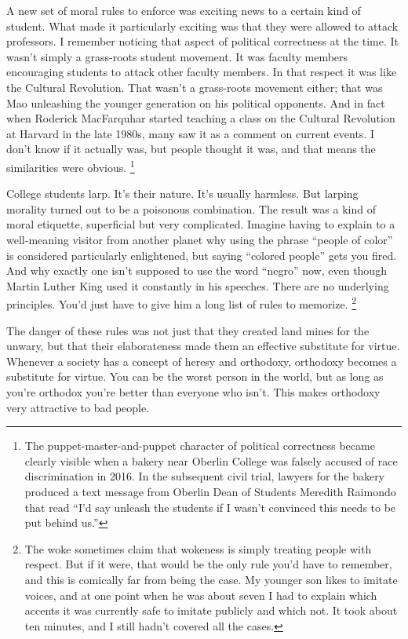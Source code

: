 A new set of moral rules to enforce was exciting news to a certain kind
of student. What made it particularly exciting was that they were
allowed to attack professors. I remember noticing that aspect of
political correctness at the time. It wasn't simply a grass-roots
student movement. It was faculty members encouraging students to attack
other faculty members. In that respect it was like the Cultural
Revolution. That wasn't a grass-roots movement either; that was Mao
unleashing the younger generation on his political opponents. And in
fact when Roderick MacFarquhar started teaching a class on the Cultural
Revolution at Harvard in the late 1980s, many saw it as a comment on
current events. I don't know if it actually was, but people thought it
was, and that means the similarities were obvious.
\footnote{The puppet-master-and-puppet character of political correctness
became clearly visible when a bakery near Oberlin College was falsely
accused of race discrimination in 2016. In the subsequent civil trial,
lawyers for the bakery produced a text message from Oberlin Dean of
Students Meredith Raimondo that read ``I'd say unleash the students if I
wasn't convinced this needs to be put behind us.''}

College students larp. It's their nature. It's usually harmless. But
larping morality turned out to be a poisonous combination. The result
was a kind of moral etiquette, superficial but very complicated. Imagine
having to explain to a well-meaning visitor from another planet why
using the phrase ``people of color'' is considered particularly
enlightened, but saying ``colored people'' gets you fired. And why
exactly one isn't supposed to use the word ``negro'' now, even though
Martin Luther King used it constantly in his speeches. There are no
underlying principles. You'd just have to give him a long list of rules
to memorize. \footnote{The woke sometimes claim that wokeness is simply treating people
with respect. But if it were, that would be the only rule you'd have to
remember, and this is comically far from being the case. My younger son
likes to imitate voices, and at one point when he was about seven I had
to explain which accents it was currently safe to imitate publicly and
which not. It took about ten minutes, and I still hadn't covered all the
cases.}

The danger of these rules was not just that they created land mines for
the unwary, but that their elaborateness made them an effective
substitute for virtue. Whenever a society has a concept of heresy and
orthodoxy, orthodoxy becomes a substitute for virtue. You can be the
worst person in the world, but as long as you're orthodox you're better
than everyone who isn't. This makes orthodoxy very attractive to bad
people.

